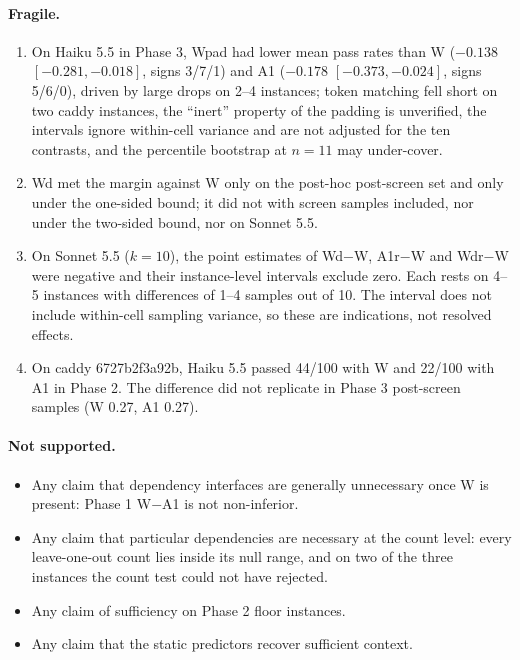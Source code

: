 \paragraph{Fragile.}
\begin{enumerate}
\item On Haiku 5.5 in Phase 3, Wpad had lower mean pass rates than W ($-0.138$ $[-0.281,-0.018]$, signs 3/7/1) and A1 ($-0.178$ $[-0.373,-0.024]$, signs 5/6/0), driven by large drops on 2--4 instances; token matching fell short on two caddy instances, the ``inert'' property of the padding is unverified, the intervals ignore within-cell variance and are not adjusted for the ten contrasts, and the percentile bootstrap at $n=11$ may under-cover.
\item Wd met the margin against W only on the post-hoc post-screen set and only under the one-sided bound; it did not with screen samples included, nor under the two-sided bound, nor on Sonnet 5.5.
\item On Sonnet 5.5 ($k=10$), the point estimates of Wd$-$W, A1r$-$W and Wdr$-$W were negative and their instance-level intervals exclude zero. Each rests on 4--5 instances with differences of 1--4 samples out of 10. The interval does not include within-cell sampling variance, so these are indications, not resolved effects.
\item On caddy 6727b2f3a92b, Haiku 5.5 passed 44/100 with W and 22/100 with A1 in Phase 2. The difference did not replicate in Phase 3 post-screen samples (W 0.27, A1 0.27).
\end{enumerate}

\paragraph{Not supported.}
\begin{itemize}
\item Any claim that dependency interfaces are generally unnecessary once W is present: Phase 1 W$-$A1 is not non-inferior.
\item Any claim that particular dependencies are necessary at the count level: every leave-one-out count lies inside its null range, and on two of the three instances the count test could not have rejected.
\item Any claim of sufficiency on Phase 2 floor instances.
\item Any claim that the static predictors recover sufficient context.
\end{itemize}

